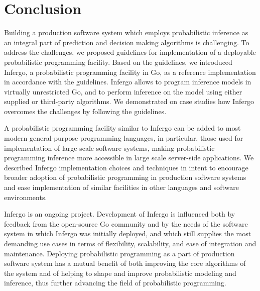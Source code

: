 \documentclass[sigplan,review,10pt,anonymous]{acmart}
\begin{document}
\begin{sloppypar}
\section{Conclusion}

Building a production software system which employs
probabilistic inference as an integral part of prediction and
decision making algorithms is challenging. To address the
challenges, we proposed guidelines for implementation of a
deployable probabilistic programming facility. Based on the
guidelines, we introduced Infergo, a probabilistic programming
facility in Go, as a reference implementation in accordance with
the guidelines.  Infergo allows to program inference models in
virtually unrestricted Go, and to perform inference on the model
using either supplied or third-party algorithms. We demonstrated
on case studies how Infergo overcomes the challenges by
following the guidelines.

A probabilistic programming facility similar to Infergo can be
added to most modern general-purpose programming languages, in
particular, those used for implementation of large-scale software
systems, making probabilistic programming inference more
accessible in large scale server-side applications. We described
Infergo implementation choices and techniques in intent
to encourage broader adoption of probabilistic programming in
production software systems and ease implementation of similar
facilities in other languages and software environments.

Infergo is an ongoing project. Development of Infergo is
influenced both by feedback from the open-source Go community
and by the needs of the software system in which Infergo was
initially deployed, and which still supplies the most demanding
use cases in terms of flexibility, scalability, and ease of
integration and maintenance. Deploying probabilistic programming
as a part of production software system has a mutual benefit of
both improving the core algorithms of the system and of helping
to shape and improve probabilistic modeling and inference, thus
further advancing the field of probabilistic programming.

\end{sloppypar}

\clearpage
\clearpage



\clearpage

\appendix
\end{document}
